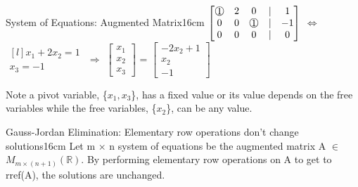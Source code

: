 \begin{definition}{System of Equations: Augmented Matrix}{16cm}
        \hspace{0.5cm}
        $\begin{bmatrix}
            \circnum{1} & 2 & 0 & | & 1 \\
            0 & 0 & \circnum{1} & | & -1 \\
            0 & 0 & 0 & | & 0
        \end{bmatrix}$
        \hspace{0.5cm}
        $\Leftrightarrow$
        \hspace{0.5cm}
        $\begin{matrix*}[l]
            x_1 + 2x_2 = 1 \\
            x_3 = -1
        \end{matrix*}$
        \hspace{0.5cm}
        $\Rightarrow$
        \hspace{0.5cm}
        $\begin{bmatrix}
            x_1 \\
            x_2 \\
            x_3
        \end{bmatrix}$ =
        $\begin{bmatrix}
            -2x_2 + 1 \\
            x_2 \\
            -1
        \end{bmatrix}$

        Note a pivot variable, \{$x_1,x_3$\}, has a fixed value
        or its value depends on the free variables while the free variables,
        \{$x_2$\}, can be any value.
    \end{definition}

    \newpage



    \begin{wtheorem}{Gauss-Jordan Elimination:
    Elementary row operations don't change solutions}{16cm}
        Let m $\times$ n system of equations be the
        augmented matrix A $\in$ $M_{m \times (n+1)}(\mathbb{R})$.
        By performing elementary row operations on A to get to rref(A),
        the solutions are unchanged.
    \end{wtheorem}

